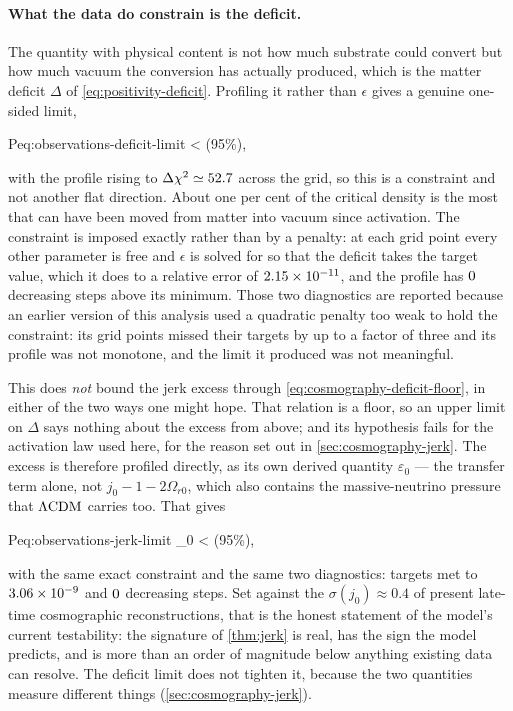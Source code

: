 \paragraph{What the data do constrain is the deficit.} The quantity with
physical content is not how much substrate could convert but how much vacuum
the conversion has actually produced, which is the matter deficit $\Delta$ of
\cref{eq:positivity-deficit}. Profiling it rather than $\epsilon$ gives a
genuine one-sided limit,
\begin{keyresult}{P}{eq:observations-deficit-limit}
  \Delta < \numProfileXiHBaselineMatterDeficitLimitNV \qquad (95\%),
\end{keyresult}
with the profile rising to $\Delta\chi^{2}\simeq52.7$
across the grid, so this is a constraint and not another flat direction. About
one per cent of the critical density is the most that can have been moved from
matter into vacuum since activation. The constraint is imposed exactly rather
than by a penalty: at each grid point every other parameter is free and
$\epsilon$ is solved for so that the deficit takes the target value, which it
does to a relative error of
$\num{2.15e-11}$, and the profile has
$0$ decreasing steps above
its minimum. Those two diagnostics are reported because an earlier version of
this analysis used a quadratic penalty too weak to hold the constraint: its
grid points missed their targets by up to a factor of three and its profile was
not monotone, and the limit it produced was not meaningful.

This does \emph{not} bound the jerk excess through
\cref{eq:cosmography-deficit-floor}, in either of the two ways one might hope.
That relation is a floor, so an upper limit on $\Delta$ says nothing about the
excess from above; and its hypothesis fails for the activation law used here,
for the reason set out in \cref{sec:cosmography-jerk}. The excess is therefore
profiled directly, as its own derived quantity $\varepsilon_0$ --- the transfer
term alone, not $j_0-1-2\Omega_{r0}$, which also contains the massive-neutrino
pressure that $\Lambda\mathrm{CDM}$ carries too. That gives
\begin{keyresult}{P}{eq:observations-jerk-limit}
  \varepsilon_0 < \numProfileXiHBaselineJerkExcessLimitNV \qquad (95\%),
\end{keyresult}
with the same exact constraint and the same two diagnostics: targets met to
$\num{3.06e-09}$ and
$0$ decreasing steps. Set
against the $\sigma(j_0)\approx0.4$ of present late-time cosmographic
reconstructions, that is the honest statement of the model's current
testability: the signature of \cref{thm:jerk} is real, has the sign the model
predicts, and is more than an order of magnitude below anything existing data
can resolve. The deficit limit does not tighten it, because the two quantities
measure different things (\cref{sec:cosmography-jerk}).

